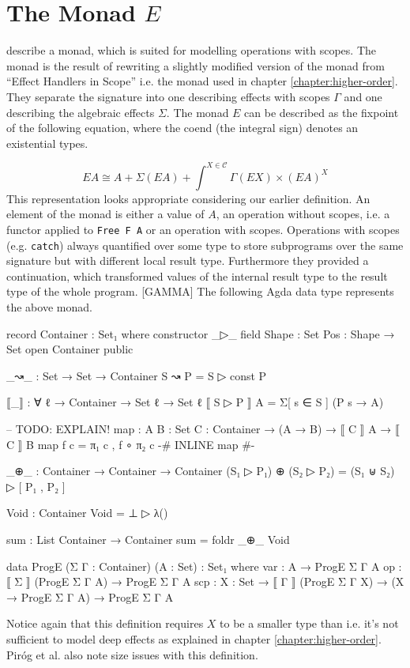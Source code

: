\section{The Monad $E$}

\textcite{DBLP:conf/lics/PirogSWJ18} describe a monad, which is suited for
modelling operations with scopes.
The monad is the result of rewriting a slightly modified version of the monad
from ``Effect Handlers in Scope'' i.e. the monad used in chapter
\ref{chapter:higher-order}.
They separate the signature into one describing effects with scopes $\Gamma$ and
one describing the algebraic effects $\Sigma$.
The monad $E$ can be described as the fixpoint of the following equation, where
the coend (the integral sign) denotes an existential types.

\[
  EA \cong A + \Sigma{}(EA) + \int^{X\in\mathscr{C}} \Gamma{}(EX) \times (EA)^X
\]
This representation looks appropriate considering our earlier definition.
An element of the monad is either a value of $A$, an operation without scopes,
i.e. a functor applied to \texttt{Free F A} or an operation with scopes.
Operations with scopes (e.g. \texttt{catch}) always quantified over some type to
store subprograms over the same signature but with different local result type.
Furthermore they provided a continuation, which transformed values of the
internal result type to the result type of the whole program.
[GAMMA]
The following Agda data type represents the above monad.

\begin{code}[hide]
record Container : Set₁ where
  constructor _▷_
  field
    Shape : Set
    Pos : Shape → Set
open Container public

_↝_ : Set → Set → Container
S ↝ P = S ▷ const P

⟦_⟧ : ∀ {ℓ} → Container → Set ℓ → Set ℓ
⟦ S ▷ P ⟧ A = Σ[ s ∈ S ] (P s → A)

-- TODO: EXPLAIN!
map : {A B : Set} {C : Container} → (A → B) → ⟦ C ⟧ A → ⟦ C ⟧ B
map f c = π₁ c , f ∘ π₂ c
{-# INLINE map #-}

_⊕_ : Container → Container → Container
(S₁ ▷ P₁) ⊕ (S₂ ▷ P₂) = (S₁ ⊎ S₂) ▷ [ P₁ , P₂ ]

Void : Container
Void = ⊥ ▷ λ()

sum : List Container → Container
sum = foldr _⊕_ Void

\end{code}
\begin{code}
data ProgE (Σ Γ : Container) (A : Set) : Set₁ where
  var  : A → ProgE Σ Γ A
  op   : ⟦ Σ ⟧ (ProgE Σ Γ A) → ProgE Σ Γ A
  scp  : {X : Set} → ⟦ Γ ⟧ (ProgE Σ Γ X) → (X → ProgE Σ Γ A) → ProgE Σ Γ A
\end{code}
Notice again that this definition requires $X$ to be a smaller type than
 i.e. it's not sufficient to model deep effects as explained in
chapter \ref{chapter:higher-order}.
Piróg et al. also note size issues with this definition.


